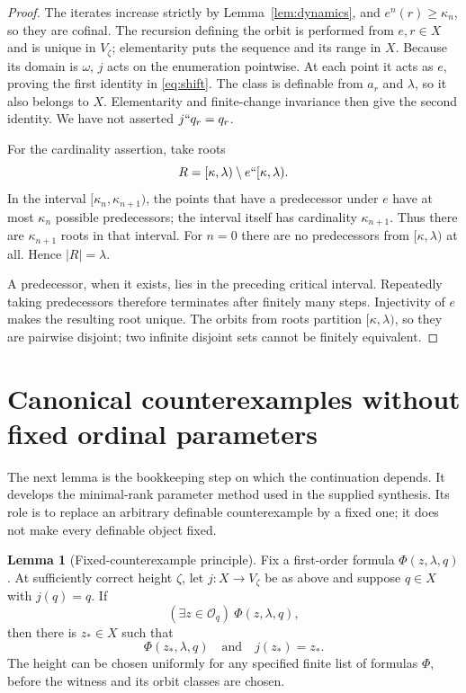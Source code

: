 \documentclass[11pt,letterpaper]{article}
\theoremstyle{definition}
\newtheorem{lemma}[definition]{Lemma}
\numberwithin{equation}{section}
\begin{document}
\begin{proof}
The iterates increase strictly by Lemma~\ref{lem:dynamics}, and $e^n(r)\ge\kappa_n$, so they are cofinal. The recursion defining the orbit is performed from $e,r\in X$ and is unique in $V_\zeta$; elementarity puts the sequence and its range in $X$. Because its domain is $\omega$, $j$ acts on the enumeration pointwise. At each point it acts as $e$, proving the first identity in \eqref{eq:shift}. The class is definable from $a_r$ and $\lambda$, so it also belongs to $X$. Elementarity and finite-change invariance then give the second identity. We have not asserted $j``q_r=q_r$.

For the cardinality assertion, take roots
\[
 R=[\kappa,\lambda)\setminus e``[\kappa,\lambda).
\]
In the interval $[\kappa_n,\kappa_{n+1})$, the points that have a predecessor under $e$ have at most $\kappa_n$ possible predecessors; the interval itself has cardinality $\kappa_{n+1}$. Thus there are $\kappa_{n+1}$ roots in that interval. For $n=0$ there are no predecessors from $[\kappa,\lambda)$ at all. Hence $|R|=\lambda$.

A predecessor, when it exists, lies in the preceding critical interval. Repeatedly taking predecessors therefore terminates after finitely many steps. Injectivity of $e$ makes the resulting root unique. The orbits from roots partition $[\kappa,\lambda)$, so they are pairwise disjoint; two infinite disjoint sets cannot be finitely equivalent.
\end{proof}

\section{Canonical counterexamples without fixed ordinal parameters}\label{sec:canonical}

The next lemma is the bookkeeping step on which the continuation depends. It develops the minimal-rank parameter method used in the supplied synthesis. Its role is to replace an arbitrary definable counterexample by a fixed one; it does not make every definable object fixed.

\begin{lemma}[Fixed-counterexample principle]\label{lem:canonical}
Fix a first-order formula $\Phi(z,\lambda,q)$. At sufficiently correct height $\zeta$, let $j:X\to V_\zeta$ be as above and suppose $q\in X$ with $j(q)=q$. If
\[
 (\exists z\in\mathcal O_q)\ \Phi(z,\lambda,q),
\]
then there is $z_*\in X$ such that
\[
 \Phi(z_*,\lambda,q)\quad\text{and}\quad j(z_*)=z_*.
\]
The height can be chosen uniformly for any specified finite list of formulas $\Phi$, before the witness and its orbit classes are chosen.
\end{lemma}
\end{document}
